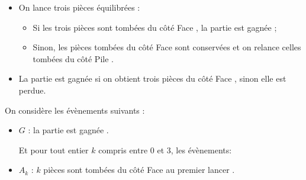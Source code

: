 \begin{itemize}[label=$\bullet~$]
\item On lance trois pièces équilibrées :
	\begin{itemize}[label=$\circ~$]
	\item Si les trois pièces sont tombées du côté \og Face \fg, la partie est gagnée ;
	\item Sinon, les pièces tombées du côté \og Face\fg{} sont conservées et on relance
celles tombées du côté \og Pile \fg.
	\end{itemize}
\item La partie est gagnée si on obtient trois pièces du côté \og Face \fg, sinon elle est
perdue.
\end{itemize}

On considère les évènements suivants :
\begin{itemize}[label=$\bullet~$]
\item $G$ : \og la partie est gagnée \fg.

Et pour tout entier $k$ compris entre 0 et 3, les évènements:
\item $A_k$ : \og $k$ pièces sont tombées du côté \og Face\fg{} au premier lancer \fg.
\end{itemize}

\medskip

